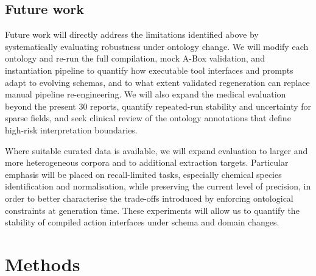 

\subsection{Future work}\label{subsec:outlook}
Future work will directly address the limitations identified above by systematically evaluating robustness under ontology change. We will modify each ontology and re-run the full compilation, mock A-Box validation, and instantiation pipeline to quantify how executable tool interfaces and prompts adapt to evolving schemas, and to what extent validated regeneration can replace manual pipeline re-engineering. We will also expand the medical evaluation beyond the present 30 reports, quantify repeated-run stability and uncertainty for sparse fields, and seek clinical review of the ontology annotations that define high-risk interpretation boundaries.

Where suitable curated data is available, we will expand evaluation to larger and more heterogeneous corpora and to additional extraction targets. Particular emphasis will be placed on recall-limited tasks, especially chemical species identification and normalisation, while preserving the current level of precision, in order to better characterise the trade-offs introduced by enforcing ontological constraints at generation time. These experiments will allow us to quantify the stability of compiled action interfaces under schema and domain changes.


  
\section{Methods}\label{sec:methods}

